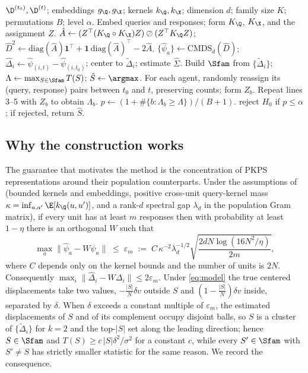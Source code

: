 \begin{algorithm}[t]
\caption{Scan test for a colluding subnetwork (two time points)}
\label{alg:main}
\begin{algorithmic}[1]
 $\D^{(t_0)}, \D^{(t)}$; embeddings $g_\Q, g_\X$; kernels $k_\Q, k_\X$; dimension $d$; family size $K$; permutations $B$; level $\alpha$.
\STATE Embed queries and responses; form $K_\Q$, $K_\X$, and the assignment $Z$.
\STATE $\hat A \leftarrow (Z^\top (K_\Q\circ K_\X) Z)\oslash(Z^\top K_\Q Z)$; $\hat D^2\leftarrow \mathrm{diag}(\hat A)\mathbf 1^\top + \mathbf 1\,\mathrm{diag}(\hat A)^\top - 2\hat A$.
\STATE $\{\hat\psi_a\}\leftarrow\mathrm{CMDS}_d(\hat D)$; $\hat\Delta_i\leftarrow\hat\psi_{(i,t)}-\hat\psi_{(i,t_0)}$; center to $\tilde\Delta_i$; estimate $\hat\Sigma$.
\STATE Build $\Sfam$ from $\{\tilde\Delta_i\}$; $\Lambda\leftarrow\max_{S\in\Sfam}T(S)$; $\hat S\leftarrow\argmax$.
  \STATE For each agent, randomly reassign its (query, response) pairs between $t_0$ and $t$, preserving counts; form $Z_b$.
  \STATE Repeat lines 3--5 with $Z_b$ to obtain $\Lambda_b$.
\ENDFOR
\STATE $p\leftarrow(1+\#\{b:\Lambda_b\ge\Lambda\})/(B+1)$.
 reject $H_0$ if $p\le\alpha$; if rejected, return $\hat S$.
\end{algorithmic}
\end{algorithm}

\subsection{Why the construction works}
\label{sec:theory}

The guarantee that motivates the method is the concentration of PKPS representations around their population counterparts. Under the assumptions of \citet[Theorem~1]{pkps2026} (bounded kernels and embeddings, positive cross-unit query-kernel mass $\kappa = \inf_{a,a'}\E[k_\Q(u,u')]$, and a rank-$d$ spectral gap $\lambda_d$ in the population Gram matrix), if every unit has at least $m$ responses then with probability at least $1-\eta$ there is an orthogonal $W$ such that
\begin{equation}
\label{eq:conc}
\max_a \|\hat\psi_a - W\psi_a\| \;\le\; \varepsilon_m
\;:=\; C\,\kappa^{-2}\lambda_d^{-1/2}\sqrt{\frac{2dN\log(16N^2/\eta)}{2m}} ,
\end{equation}
where $C$ depends only on the kernel bounds and the number of units is $2N$. Consequently $\max_i\|\hat\Delta_i - W\Delta_i\|\le 2\varepsilon_m$. Under \eqref{eq:model} the true centered displacements take two values, $-\tfrac{|S|}{N}\delta v$ outside $S$ and $(1-\tfrac{|S|}{N})\delta v$ inside, separated by $\delta$. When $\delta$ exceeds a constant multiple of $\varepsilon_m$, the estimated displacements of $S$ and of its complement occupy disjoint balls, so $S$ is a cluster of $\{\tilde\Delta_i\}$ for $k=2$ and the top-$|S|$ set along the leading direction; hence $S\in\Sfam$ and $T(S)\ge c\,|S|\delta^2/\sigma^2$ for a constant $c$, while every $S'\in\Sfam$ with $S'\ne S$ has strictly smaller statistic for the same reason. We record the consequence.

